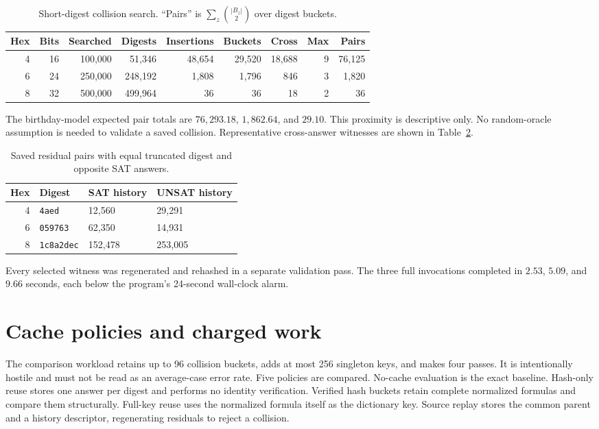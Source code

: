 \documentclass[11pt]{article}
\begin{document}
\begin{table}[ht]
\centering
\small
\begin{tabular}{@{}rrrrrrrrr@{}}
\toprule
Hex & Bits & Searched & Digests & Insertions & Buckets & Cross & Max & Pairs\\
\midrule
4 & 16 & 100,000 & 51,346 & 48,654 & 29,520 & 18,688 & 9 & 76,125\\
6 & 24 & 250,000 & 248,192 & 1,808 & 1,796 & 846 & 3 & 1,820\\
8 & 32 & 500,000 & 499,964 & 36 & 36 & 18 & 2 & 36\\
\bottomrule
\end{tabular}
\caption{Short-digest collision search.  ``Pairs'' is
$\sum_z\binom{|B_z|}{2}$ over digest buckets.}
\label{tab:search}
\end{table}

The birthday-model expected pair totals are $76{,}293.18$, $1{,}862.64$, and
$29.10$.  This proximity is descriptive only.  No random-oracle assumption is
needed to validate a saved collision.  Representative cross-answer witnesses
are shown in Table~\ref{tab:witness}.

\begin{table}[ht]
\centering
\begin{tabular}{@{}rlll@{}}
\toprule
Hex & Digest & SAT history & UNSAT history\\
\midrule
4 & \texttt{4aed} & 12,560 & 29,291\\
6 & \texttt{059763} & 62,350 & 14,931\\
8 & \texttt{1c8a2dec} & 152,478 & 253,005\\
\bottomrule
\end{tabular}
\caption{Saved residual pairs with equal truncated digest and opposite SAT
answers.}
\label{tab:witness}
\end{table}

Every selected witness was regenerated and rehashed in a separate validation
pass.  The three full invocations completed in $2.53$, $5.09$, and $9.66$
seconds, each below the program's 24-second wall-clock alarm.

\section{Cache policies and charged work}

The comparison workload retains up to 96 collision buckets, adds at most 256
singleton keys, and makes four passes.  It is intentionally hostile and must
not be read as an average-case error rate.  Five policies are compared.
No-cache evaluation is the exact baseline.  Hash-only reuse stores one answer
per digest and performs no identity verification.  Verified hash buckets
retain complete normalized formulas and compare them structurally.  Full-key
reuse uses the normalized formula itself as the dictionary key.  Source replay
stores the common parent and a history descriptor, regenerating residuals to
reject a collision.
\end{document}
